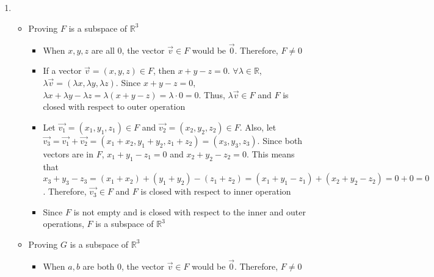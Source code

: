 \documentclass[12pt]{article}
\begin{document}
        \subsection{}
            \begin{enumerate}[label=(\alph*)]
                \item 
                    \begin{itemize}
                        \item Proving $F$ is a subspace of $\mathbb{R}^3$
                            \begin{itemize}
                                \item When $x, y, z$ are all 0, the vector $\vec{v} \in F$ would be $\vec{0}$. Therefore, $F\neq 0$
                                \item If a vector $\vec{v} = (x, y, z) \in F$, 
                                    then $x + y - z = 0$. 
                                    $\forall \lambda \in \mathbb{R}$, 
                                    $\lambda \vec{v} = (\lambda x, \lambda y, \lambda z)$. 
                                    Since $x + y - z = 0$, 
                                    $\lambda x + \lambda y - \lambda z = \lambda(x + y - z) = \lambda \cdot 0 = 0$. 
                                    Thus, $\lambda \vec{v} \in F$ and $F$ is closed with respect to outer operation
                                \item Let $\vec{v_1} = (x_1, y_1, z_1) \in F$ and $\vec{v_2} = (x_2, y_2, z_2) \in F$. Also, let $\vec{v_3} = \vec{v_1} + \vec{v_2} = (x_1 + x_2, y_1 + y_2, z_1 + z_2) = (x_3, y_3, z_3)$. Since both vectors are in $F$, $x_1 + y_1 - z_1 = 0$ and $x_2 + y_2 - z_2 = 0$. This means that $x_3 + y_3 - z_3 = (x_1 + x_2) + (y_1 + y_2) - (z_1 + z_2) = (x_1 + y_1 - z_1) + (x_2 + y_2 - z_2) = 0 + 0 = 0$. Therefore, $\vec{v_3}\in F$ and $F$ is closed with respect to inner operation
                                \item Since $F$ is not empty and is closed with respect to the inner and outer operations, $F$ is a subspace of $\mathbb{R}^3$
                            \end{itemize}
                        \item Proving $G$ is a subspace of $\mathbb{R}^3$
                            \begin{itemize}
                                \item When $a, b$ are both 0, the vector $\vec{v} \in F$ would be $\vec{0}$. Therefore, $F\neq 0$

\end{itemize}
\end{itemize}
\end{enumerate}
\end{document}
